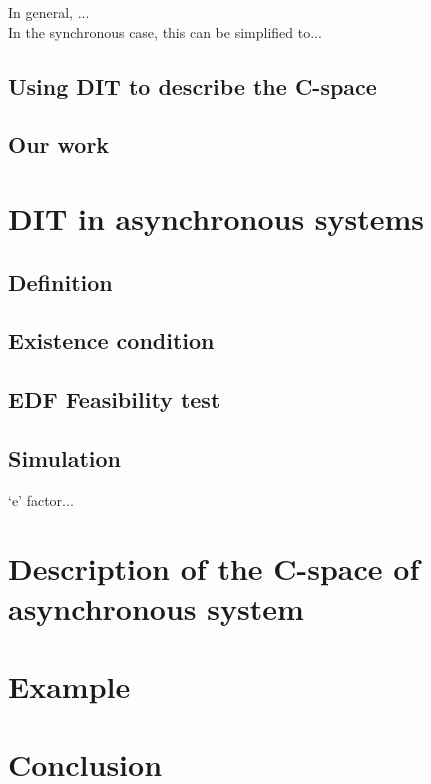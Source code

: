 \documentclass[times, 10pt,twocolumn, a4paper]{article}
\begin{document}
  In general, ...\\

  In the synchronous case, this can be simplified to...

  \subsection{Using DIT to describe the C-space}

  \subsection{Our work}

\section{DIT in asynchronous systems}

  \subsection{Definition}

  \subsection{Existence condition}

  \subsection{EDF Feasibility test}

  \subsection{Simulation}

  `e' factor...

\section{Description of the C-space of asynchronous system}

\section{Example}

\section{Conclusion}



\end{document}
